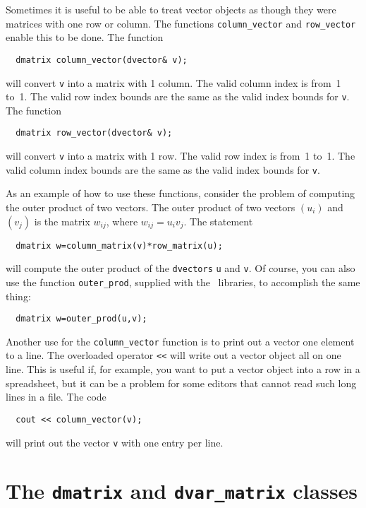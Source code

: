 \documentclass{admbmanual}
\begin{document}
Sometimes it is useful to be able to treat vector objects as
though they were matrices with one row or column. The functions
\texttt{column\_vector} and \texttt{row\_vector} enable this to
be done.  The function
\begin{lstlisting}
  dmatrix column_vector(dvector& v);
\end{lstlisting}
will convert \texttt{v} into a matrix  with 1 column. The valid column
index is from~1 to~1. The valid row index bounds are the same 
as the valid index bounds for \texttt{v}. The function
\begin{lstlisting}
  dmatrix row_vector(dvector& v);
\end{lstlisting}
will convert \texttt{v} into a matrix  with 1 row. The valid row 
index is from~1 to~1. The valid column index bounds are the same 
as the valid index bounds for \texttt{v}. 

As an example of how to use these functions, consider the problem
of computing the outer product of two vectors. The outer product
of two vectors $(u_i)$ and $(v_j)$ is the matrix $w_{ij}$,
where $w_{ij}=u_iv_j$.  The statement
\begin{lstlisting}
  dmatrix w=column_matrix(v)*row_matrix(u);
\end{lstlisting}
will compute the outer product of the \texttt{dvectors}
\texttt{u} and \texttt{v}. Of course, you can also use the
function \texttt{outer\_prod}, supplied with the \scAD\ libraries,
to accomplish the same thing:
\begin{lstlisting}
  dmatrix w=outer_prod(u,v);
\end{lstlisting}

Another use for the \texttt{column\_vector} function is to
print out a vector one element to a line. The overloaded
operator \texttt{<{}<} will  write out a vector object all on
one line. This is useful if, for example, you want to put a vector object into a row
in a spreadsheet, but it can be a problem for
some editors that cannot read such long lines in a file.
The code
\begin{lstlisting}
  cout << column_vector(v);
\end{lstlisting}
will print out the vector \texttt{v} with one entry per line.


\section{The \texttt{dmatrix} and \texttt{dvar\_matrix} classes}
\end{document}
